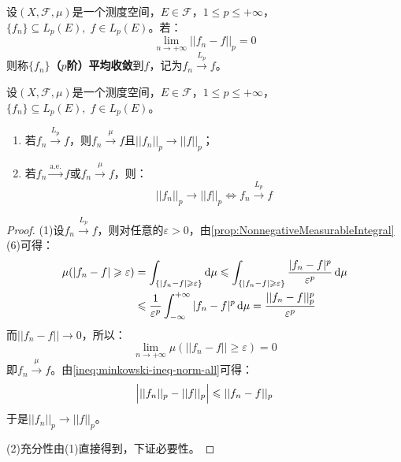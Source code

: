 \begin{definition}
	设$(X,\mathscr{F},\mu)$是一个测度空间，$E\in\mathscr{F}$，$1\leqslant p\leqslant+\infty$，$\{f_n\}\subseteq L_p(E),\;f\in L_p(E)$。若：
	\begin{equation*}
		\lim_{n\to+\infty}||f_n-f||_p=0
	\end{equation*}
	则称$\{f_n\}$\textbf{（$p$阶）平均收敛}到$f$，记为$f_n\overset{L_p}{\longrightarrow}f$。
\end{definition}
\begin{theorem}
	设$(X,\mathscr{F},\mu)$是一个测度空间，$E\in\mathscr{F}$，$1\leqslant p\leqslant+\infty$，$\{f_n\}\subseteq L_p(E),\;f\in L_p(E)$。
	\begin{enumerate}
		\item 若$f_n\overset{L_p}{\longrightarrow}f$，则$f_n\overset{\mu}{\longrightarrow}f$且$||f_n||_p\to||f||_p$；
		\item 若$f_n\overset{\text{a.e.}}{\longrightarrow}f$或$f_n\overset{\mu}{\longrightarrow}f$，则：
		\begin{equation*}
			||f_n||_p\to||f||_p\Leftrightarrow f_n\overset{L_p}{\longrightarrow}f
		\end{equation*}
	\end{enumerate}
\end{theorem}
\begin{proof}
	(1)设$f_n\overset{L_p}{\longrightarrow}f$，则对任意的$\varepsilon>0$，由\cref{prop:NonnegativeMeasurableIntegral}(6)可得：
	\begin{align*}
		\mu(|f_n-f|\geqslant\varepsilon)
		&=\int_{\{|f_n-f|\geqslant\varepsilon\}}\mathop{}\!\mathrm{d}\mu\leqslant\int_{\{|f_n-f|\geqslant\varepsilon\}}\frac{|f_n-f|^p}{\varepsilon^p}\mathop{}\!\mathrm{d}\mu \\
		&\leqslant\frac{1}{\varepsilon^p}\int_{-\infty}^{+\infty}|f_n-f|^p\mathop{}\!\mathrm{d}\mu=\frac{||f_n-f||^p_p}{\varepsilon^p}
	\end{align*}
	而$||f_n-f||\to0$，所以：
	\begin{equation*}
		\lim_{n\to+\infty}\mu(||f_n-f||\geqslant\varepsilon)=0
	\end{equation*}
	即$f_n\overset{\mu}{\longrightarrow}f$。由\cref{ineq:minkowski-ineq-norm-all}可得：
	\begin{equation*}
		\Bigl|||f_n||_p-||f||_p\Bigr|\leqslant||f_n-f||_p
	\end{equation*}
	于是$||f_n||_p\to||f||_p$。\par
	(2)充分性由(1)直接得到，下证必要性。
\end{proof}